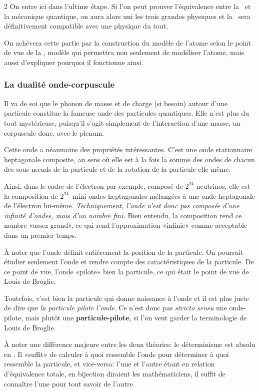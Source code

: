 \begin{multicols}{2}
On entre ici dans l'ultime étape. Si l'on peut prouver l'équivalence
entre la \PQ\ et la mécanique quantique, on aura alors uni les trois
grandes physiques et la \PQ\ sera définitivement compatible avec une
physique du tout.

On achèvera cette partie par la construction du modèle de l'atome
selon le point de vue de la \PQ, modèle qui permettra non seulement
de modéliser l'atome, mais aussi d'expliquer pourquoi il fonctionne
ainsi.

\subsubsection{La dualité onde-corpuscule}

Il va de soi que le phonon de masse et de charge (si besoin) autour
d'une particule constitue la fameuse onde des particules quantiques.
Elle n'est plus du tout mystérieuse, puisqu'il s'agit simplement de
l'interaction d'une masse, un corpuscule donc, avec le plenum.

Cette onde a néanmoins des propriétés intéressantes. C'est une onde
stationnaire heptagonale composite, au sens où elle est à la fois la
somme des ondes de chacun des sous-nœuds de la particule et de la
rotation de la particule elle-même.

Ainsi, dans le cadre de l'électron par exemple, composé de $2^{24}$ neutrinos, elle
est la composition de $2^{24}$~mini-ondes heptagonales mélangées à une onde
heptagonale de l'électron lui-même. \textit{Techniquement, l'onde n'est donc
pas composée d'une infinité d'ondes, mais d'un nombre fini.} Bien
entendu, la composition rend ce nombre «assez grand», ce qui rend
l'approximation «infinie» comme acceptable dans un premier temps.

À noter que l'onde définit entièrement la position de la particule. On
pourrait étudier seulement l'onde et rendre compte des
caractéristiques de la particule. De ce point de vue, l'onde
«pilote» bien la particule, ce qui était le point de vue de Louis de
Broglie.\cite{debroglie1924recherches}

Toutefois, c'est bien la particule qui donne naissance à l'onde et il
est plus juste de dire que \textit{la particule pilote l'onde}. Ce n'est donc
pas \textit{stricto sensu} une onde-pilote, mais plutôt une \textbf{particule-pilote},
si l'on veut garder la terminologie de Louis de Broglie.


À noter une différence majeure entre les deux théories: le
déterminisme est absolu en \PQ. Il «suffit» de calculer à quoi
ressemble l'onde pour déterminer à quoi ressemble la particule, et
vice-versa: l'une et l'autre étant en relation d'équivalence totale,
en bijection diraient les mathématiciens, il suffit de connaître l'une
pour tout savoir de l'autre.


\end{multicols}
